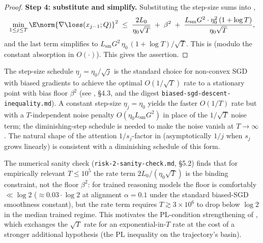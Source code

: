 \begin{proof}
\noindent\textbf{Step 4: substitute and simplify.}
Substituting the step-size sums into ,
\begin{align*}
   \min_{1 \le j \le T} \E \norm{\nabla \loss(x_{j-1}; Q)}^2
   \;\le\;
   \frac{2 L_0}{\eta_0 \sqrt T}
   \;+\; \beta^2
   \;+\; \frac{L_{\mathrm{sm}} G^2 \cdot \eta_0^2\, (1 + \log T)}{\eta_0 \sqrt T},
\end{align*}
and the last term simplifies to
$L_{\mathrm{sm}} G^2\, \eta_0\, (1 + \log T) / \sqrt T$. This is
 (modulo the constant absorption in $O(\cdot)$).
This gives the assertion.
\end{proof}

\begin{remark}\label{rem:telescoping_step_size}
The step-size schedule $\eta_j = \eta_0/\sqrt j$ is the standard
choice for non-convex SGD with biased gradients to achieve the
optimal $O(1/\sqrt T)$ rate to a stationary point with bias floor
$\beta^2$ (see \cite{bottou2018optimization}, \S 4.3, and
the digest \texttt{biased-sgd-descent-inequality.md}). A constant
step-size $\eta_j = \eta_0$ yields the faster $O(1/T)$ rate but with a
$T$-independent noise penalty $O(\eta_0 L_{\mathrm{sm}} G^2)$ in place
of the $1/\sqrt T$ noise term; the diminishing-step schedule is needed
to make the noise vanish at $T \to \infty$. The natural shape of the
attention $1/s_j$-factor in  (asymptotically $1/j$ when
$s_j$ grows linearly) is consistent with a diminishing schedule of this
form.
\end{remark}

\begin{remark}\label{rem:rate_dominates}
The numerical sanity check
(\texttt{risk-2-sanity-check.md}, \S 5.2) finds that for
empirically relevant $T \le 10^5$ the rate term $2 L_0 / (\eta_0 \sqrt T)$
is the binding constraint, not the floor $\beta^2$: for trained
reasoning models the floor is comfortably $\ll \log 2$
($\approx 0.03 \cdot \log 2$ at alignment $\alpha = 0.1$ under the
standard biased-SGD smoothness constant), but the rate term requires
$T \gtrsim 3 \times 10^6$ to drop below $\log 2$ in the median trained
regime. This motivates the PL-condition strengthening of
, which exchanges the $\sqrt T$ rate for
an exponential-in-$T$ rate at the cost of a stronger additional
hypothesis (the PL inequality on the trajectory's basin).
\end{remark}
